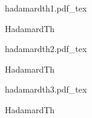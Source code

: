 \documentclass[12pt,a4paper]{article}
\newcommand{\incfig}[1]{%
    \def\svgwidth{\columnwidth}
    {#1.pdf_tex}
}
\begin{document}
\begin{figure}[ht]
    \centering
	\begin{minipage}[c][\totalheight][c]{\columnwidth}
    \incfig{hadamardth1}
    \caption{HadamardTh}
	\end{minipage}
    \label{fig:hadamardth}
\end{figure}
\begin{figure}[ht]
    \centering
	\begin{minipage}[c][\totalheight][c]{\columnwidth}
    \incfig{hadamardth2}
    \caption{HadamardTh}
	\end{minipage}
    \label{fig:hadamardth}
\end{figure}
\begin{figure}[ht]
    \centering
	\begin{minipage}[c][\totalheight][c]{\columnwidth}
    \incfig{hadamardth3}
    \caption{HadamardTh}
	\end{minipage}
    \label{fig:hadamardth}
\end{figure}
\end{document}
